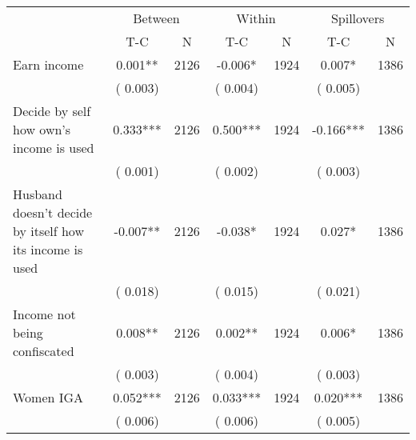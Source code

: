 
\begin{tabular}{l*{6}{c}}\hline&\multicolumn{2}{c}{Between}&\multicolumn{2}{c}{Within}&\multicolumn{2}{c}{Spillovers} \\ \cmidrule(r){2-3}\cmidrule(l){4-5}\cmidrule(l){6-7} & {T-C} & {N} & {T-C} & {N}  & {T-C}  & {N}  \\ \midrule
Earn income        &              0.001**      &       2126       &             -0.006*      &       1924       &              0.007*      &       1386       \\
                       &       (       0.003)            &                               &       (       0.004)            &                               &       (       0.005)            &                               \\
Decide by self how own's income is used        &              0.333***      &       2126       &              0.500***      &       1924       &             -0.166***      &       1386       \\
                       &       (       0.001)            &                               &       (       0.002)            &                               &       (       0.003)            &                               \\
Husband doesn't decide by itself how its income is used        &             -0.007**      &       2126       &             -0.038*      &       1924       &              0.027*      &       1386       \\
                       &       (       0.018)            &                               &       (       0.015)            &                               &       (       0.021)            &                               \\
Income not being confiscated        &              0.008**      &       2126       &              0.002**      &       1924       &              0.006*      &       1386       \\
                       &       (       0.003)            &                               &       (       0.004)            &                               &       (       0.003)            &                               \\
Women IGA        &              0.052***      &       2126       &              0.033***      &       1924       &              0.020***      &       1386       \\
                       &       (       0.006)            &                               &       (       0.006)            &                               &       (       0.005)            &                               \\

\end{tabular}
